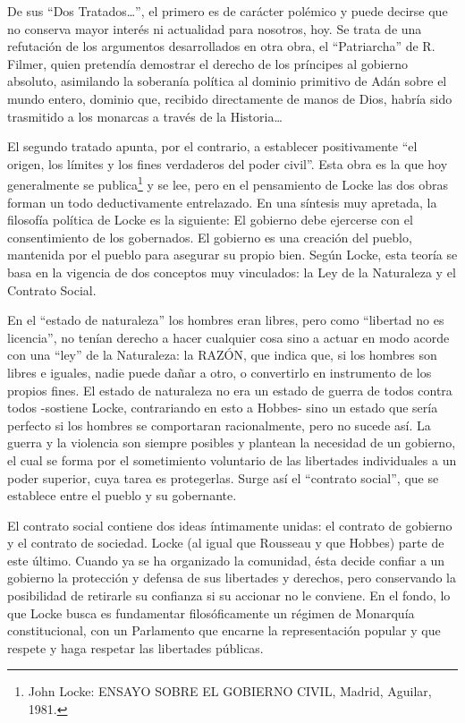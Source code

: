 \documentclass[
]{book}
\begin{document}
De sus ``Dos Tratados\ldots{}'', el primero es de carácter polémico y puede decirse que no conserva mayor interés ni actualidad para nosotros, hoy. Se trata de una refutación de los argumentos desarrollados en otra obra, el ``Patriarcha'' de R. Filmer, quien pretendía demostrar el derecho de los príncipes al gobierno absoluto, asimilando la soberanía política al dominio primitivo de Adán sobre el mundo entero, dominio que, recibido directamente de manos de Dios, habría sido trasmitido a los monarcas a través de la Historia\ldots{}

El segundo tratado apunta, por el contrario, a establecer positivamente ``el origen, los límites y los fines verdaderos del poder civil''. Esta obra es la que hoy generalmente se publica\footnote{John Locke: ENSAYO SOBRE EL GOBIERNO CIVIL, Madrid, Aguilar, 1981.} y se lee, pero en el pensamiento de Locke las dos obras forman un todo deductivamente entrelazado. En una síntesis muy apretada, la filosofía política de Locke es la siguiente: El gobierno debe ejercerse con el consentimiento de los gobernados. El gobierno es una creación del pueblo, mantenida por el pueblo para asegurar su propio bien. Según Locke, esta teoría se basa en la vigencia de dos conceptos muy vinculados: la Ley de la Naturaleza y el Contrato Social.

En el ``estado de naturaleza'' los hombres eran libres, pero como ``libertad no es licencia'', no tenían derecho a hacer cualquier cosa sino a actuar en modo acorde con una ``ley'' de la Naturaleza: la RAZÓN, que indica que, si los hombres son libres e iguales, nadie puede dañar a otro, o convertirlo en instrumento de los propios fines. El estado de naturaleza no era un estado de guerra de todos contra todos -sostiene Locke, contrariando en esto a Hobbes- sino un estado que sería perfecto si los hombres se comportaran racionalmente, pero no sucede así. La guerra y la violencia son siempre posibles y plantean la necesidad de un gobierno, el cual se forma por el sometimiento voluntario de las libertades individuales a un poder superior, cuya tarea es protegerlas. Surge así el ``contrato social'', que se establece entre el pueblo y su gobernante.

El contrato social contiene dos ideas íntimamente unidas: el contrato de gobierno y el contrato de sociedad. Locke (al igual que Rousseau y que Hobbes) parte de este último. Cuando ya se ha organizado la comunidad, ésta decide confiar a un gobierno la protección y defensa de sus libertades y derechos, pero conservando la posibilidad de retirarle su confianza si su accionar no le conviene. En el fondo, lo que Locke busca es fundamentar filosóficamente un régimen de Monarquía constitucional, con un Parlamento que encarne la representación popular y que respete y haga respetar las libertades públicas.
\end{document}
